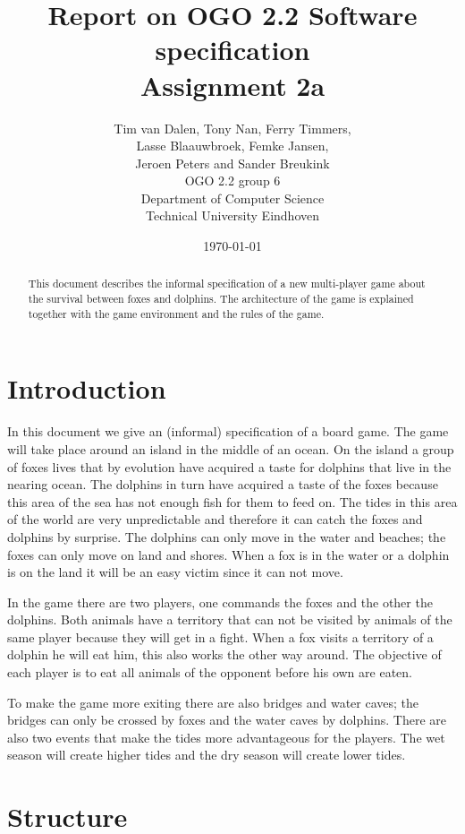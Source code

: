 \documentclass[12pt]{article}
\title{Report on OGO 2.2 Software specification\\ Assignment 2a}
\author{
        Tim van Dalen, Tony Nan, Ferry Timmers, \\ Lasse Blaauwbroek, Femke Jansen, \\Jeroen Peters and Sander Breukink\\ OGO 2.2 group 6 \\
                Department of Computer Science\\
        Technical University Eindhoven\\
}
\date{\today}
\begin{document}
\maketitle

\begin{abstract}
This document describes the informal specification of a new multi-player game about the survival between foxes and dolphins. The architecture of the game is explained together with the game environment and the rules of the game.
\end{abstract}

\section{Introduction}

In this document we give an (informal) specification of a board game.
The game will take place around an island in the middle of an ocean.
On the island a group of foxes
lives that by evolution have acquired a taste for dolphins that live
in the nearing ocean. The dolphins in turn have acquired a taste of
the foxes because this area of the sea has not enough fish for them
to feed on. The tides in this area of the world are very unpredictable
and therefore it can catch the foxes and dolphins by surprise. The
dolphins can only move in the water and beaches; the foxes can only
move on land and shores. When a fox is in the water or a dolphin is
on the land it will be an easy victim since it can not move.

In the game there are two players, one commands the foxes and the
other the dolphins. Both animals have a territory that can not be
visited by animals of the same player because they will get in a fight.
When a fox visits a territory of a dolphin he will eat him, this also
works the other way around. The objective of each player is to eat
all animals of the opponent before his own are eaten.

To make the game more exiting there are also bridges and water caves;
the bridges can only be crossed by foxes and the water caves by dolphins.
There are also two events that make the tides more advantageous for
the players. The wet season will create higher tides and the dry season
will create lower tides.

\section{Structure}
\end{document}
